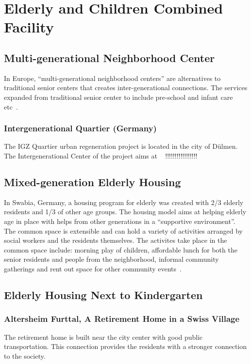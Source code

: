 \section{Elderly and Children Combined Facility}
\subsection{Multi-generational Neighborhood Center}
In Europe, ``multi-generational neighborhood centers''
are alternatives to traditional senior centers that creates
inter-generational connections. The services expanded from traditional
senior center to include pre-school and infant care etc~\cite{Fromm2015}. 

\subsubsection{Intergenerational Quartier (Germany)}
The IGZ Quartier urban regeneration project is located in the city of
D{\"u}lmen. The Intergenerational Center of the project aims at ~\cite{Dulmen2014}
!!!!!!!!!!!!!!!!!
\subsection{Mixed-generation Elderly Housing}
In Swabia, Germany, a housing program for elderly was created with 2/3
elderly residents and 1/3 of other age groups. The housing model aims
at helping elderly age in place with helps from other generations in a
``supportive environment''. The common space is extensible and can
hold a variety of activities arranged by social workers and the
residents themselves. The activites take place in the common space
include: morning play of children, affordable lunch for both the
senior residents and people from the neighborhood, informal community
gatherings and rent out space for other community events~\cite{Fromm2015}.

\subsection{Elderly Housing Next to Kindergarten}
\subsubsection{Altersheim Furttal, A Retirement Home in a Swiss Village}
The retirement home is built near the city center with good public
transportation. This connection provides the residents with a stronger
connection to the society.

